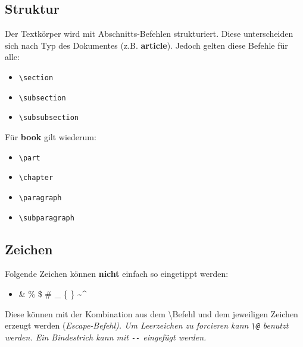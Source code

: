 \documentclass[10pt]{article}  %
\begin{document}
    \subsection{Struktur}
        Der Textkörper wird mit Abschnitts-Befehlen strukturiert. Diese unterscheiden sich nach Typ des Dokumentes (z.B. \textbf{article}). Jedoch gelten diese Befehle für alle:
        \begin{itemize}
            \item \verb!\section!
            \item \verb!\subsection!
            \item \verb!\subsubsection!
        \end{itemize}
        Für \textbf{book} gilt wiederum:
        \begin{itemize}
            \item \verb!\part!
            \item \verb!\chapter!
            \item \verb!\paragraph!
            \item \verb!\subparagraph!
        \end{itemize}

    \subsection{Zeichen}
        Folgende Zeichen können \textbf{nicht} einfach so eingetippt werden:
        \begin{itemize}
            \item \& \@ \% \@ \$ \@ \# \@ \_ \@ \{ \@ \} \@ \~ \@ \^ \@
        \end{itemize}
        Diese können mit der Kombination aus dem \textbackslash \@ Befehl und dem jeweiligen Zeichen erzeugt werden (\em Escape-Befehl\normalfont).  %
        Um Leerzeichen zu forcieren kann \verb!\@! benutzt werden. Ein Bindestrich kann mit \verb!--! eingefügt werden.
\end{document}
